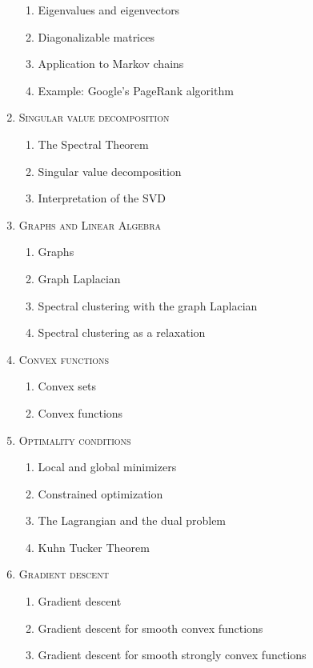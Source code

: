 \begin{enumerate}[label=\textbf{\arabic*.}]
\vspace{-0.2cm}
\begin{enumerate}[label=\arabic*.,noitemsep]
\item Eigenvalues and eigenvectors
\item Diagonalizable matrices
\item Application to Markov chains
\item Example: Google's PageRank algorithm
\end{enumerate}
\item \textsc{Singular value decomposition}
\vspace{-0.2cm}
\begin{enumerate}[label=\arabic*.,noitemsep]
\item The Spectral Theorem
\item Singular value decomposition
\item Interpretation of the SVD
\end{enumerate}
\item \textsc{Graphs and Linear Algebra}
\vspace{-0.2cm}
\begin{enumerate}[label=\arabic*.,noitemsep]
\item Graphs
\item Graph Laplacian
\item Spectral clustering with the graph Laplacian
\item Spectral clustering as a relaxation
\end{enumerate}
\item \textsc{Convex functions}
\vspace{-0.2cm}
\begin{enumerate}[label=\arabic*.,noitemsep]
\item Convex sets
\item Convex functions
\end{enumerate}
\item \textsc{Optimality conditions}
\vspace{-0.2cm}
\begin{enumerate}[label=\arabic*.,noitemsep]
\item Local and global minimizers
\item Constrained optimization
\item The Lagrangian and the dual problem
\item Kuhn Tucker Theorem
\end{enumerate}
\item \textsc{Gradient descent}
\vspace{-0.2cm}
\begin{enumerate}[label=\arabic*.,noitemsep]
\item Gradient descent
\item Gradient descent for smooth convex functions
\item Gradient descent for smooth strongly convex functions
\end{enumerate}
\end{enumerate}
